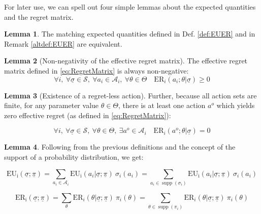 \documentclass{article}
\theoremstyle{definition}
\newtheorem{lemma}{Lemma}[section]
\DeclareMathOperator\supp{supp}
\begin{document}
For later use, we can spell out four simple lemmas about the expected quantities and the regret matrix.

\begin{lemma}
    The matching expected quantities defined in Def. \autoref{def:EUER} and in Remark \ref{altdef:EUER} are equivalent.
    
\end{lemma}

\begin{lemma}[Non-negativity of the effective regret matrix]
\label{lemma:NonNegativeRegret}
    The effective regret matrix defined in \eqref{eq:RegretMatrix} is always non-negative:
    \begin{equation}
        \forall i, \ \forall \underline{\sigma} \in \mathcal{S}, \ \forall a_i \in \mathcal{A}_i, \ \forall \theta \in \Theta \quad
        \mathrm{ER}_i(a_i;\theta | \underline{\sigma}) \ge 0
    \end{equation}
    
\end{lemma}

\begin{lemma}[Existence of a regret-less action]
\label{lemma:ExistenceBestResponse}
    Further, because all action sets are finite, for any parameter value $\theta \in \Theta$, there is at least one action $a^o$ which yields zero effective regret (as defined in \eqref{eq:RegretMatrix}):

    \begin{equation}
        \forall i, \ \forall \underline{\sigma} \in \mathcal{S}, \ \forall \theta \in \Theta, \ \exists a^o \in \mathcal{A}_i \quad
        \mathrm{ER}_i(a^o;\theta | \underline{\sigma}) = 0
    \end{equation}
    
\end{lemma}

\begin{lemma}
\label{lemma:EUER}
     Following from the previous definitions and the concept of the support of a probability distribution, we get:
     
    \begin{equation}
        \mathrm{EU_i}(\underline{\sigma};\underline{\pi})
        =
        \sum_{a_i \in \mathcal{A}_i} \mathrm{EU_i}(a_i|\underline{\sigma};\underline{\pi}) \ \sigma_i(a_i)
        =
        \sum_{a_i \in \supp(\sigma_i)} \mathrm{EU_i}(a_i|\underline{\sigma};\underline{\pi}) \ \sigma_i(a_i)
    \end{equation}

    \begin{equation}
        \mathrm{ER_i}(\underline{\sigma};\underline{\pi})
        =
        \sum_{\theta} \mathrm{ER}_i(\theta | \underline{\sigma};\underline{\pi}) \ \pi_i(\theta)
        =
        \sum_{\theta \in \supp(\pi_i)} \mathrm{ER}_i(\theta | \underline{\sigma};\underline{\pi}) \ \pi_i(\theta)
    \end{equation}
    
\end{lemma}
\end{document}
